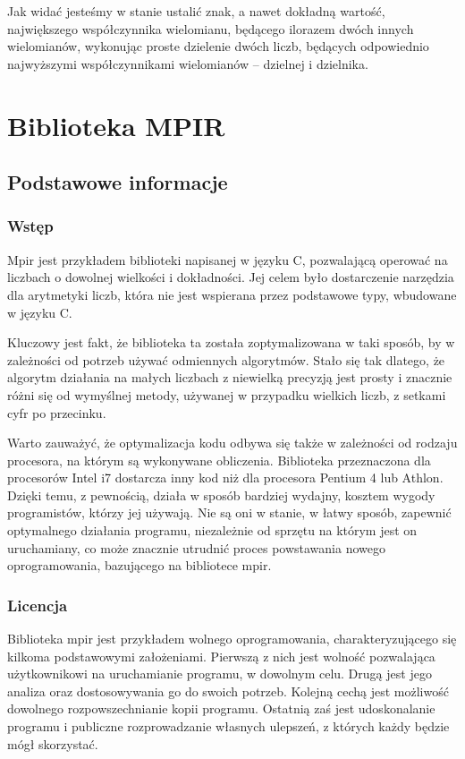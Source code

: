 \documentclass[oneside,a4paper]{book}
\begin{document}
	Jak widać jesteśmy w stanie ustalić znak, a nawet dokładną wartość, największego współczynnika wielomianu, będącego ilorazem dwóch innych wielomianów, wykonując proste dzielenie dwóch liczb, będących odpowiednio najwyższymi współczynnikami wielomianów -- dzielnej i dzielnika.
	
	\section{Biblioteka MPIR}
	
	\subsection{Podstawowe informacje}
	
	\subsubsection{Wstęp}
	
	Mpir jest przykładem biblioteki napisanej w języku C, pozwalającą operować na liczbach o dowolnej wielkości i dokładności. Jej celem było dostarczenie narzędzia dla arytmetyki liczb, która nie jest wspierana przez podstawowe typy, wbudowane w języku C.
	
	Kluczowy jest fakt, że biblioteka ta została zoptymalizowana w taki sposób, by w zależności od potrzeb używać odmiennych algorytmów. Stało się tak dlatego, że algorytm działania na małych liczbach z niewielką precyzją jest prosty i znacznie różni się od wymyślnej metody, używanej w przypadku wielkich liczb, z setkami cyfr po przecinku.
	
	Warto zauważyć, że optymalizacja kodu odbywa się także w zależności od rodzaju procesora, na którym są wykonywane obliczenia. Biblioteka przeznaczona dla procesorów Intel i7 dostarcza inny kod niż dla procesora Pentium 4 lub Athlon. Dzięki temu, z pewnością, działa w sposób bardziej wydajny, kosztem wygody programistów, którzy jej używają. Nie są oni w stanie, w łatwy sposób, zapewnić optymalnego działania programu, niezależnie od sprzętu na którym jest on uruchamiany, co może znacznie utrudnić proces powstawania nowego oprogramowania, bazującego na bibliotece mpir.
	
	\subsubsection{Licencja}
	
	Biblioteka mpir jest przykładem wolnego oprogramowania, charakteryzującego się kilkoma podstawowymi założeniami. Pierwszą z nich jest wolność pozwalająca użytkownikowi na uruchamianie programu, w dowolnym celu. Drugą jest jego analiza oraz dostosowywania go do swoich potrzeb. Kolejną cechą jest możliwość dowolnego rozpowszechnianie kopii programu. Ostatnią zaś jest udoskonalanie programu i publiczne rozprowadzanie własnych ulepszeń, z których każdy będzie mógł skorzystać.
	
\end{document}
